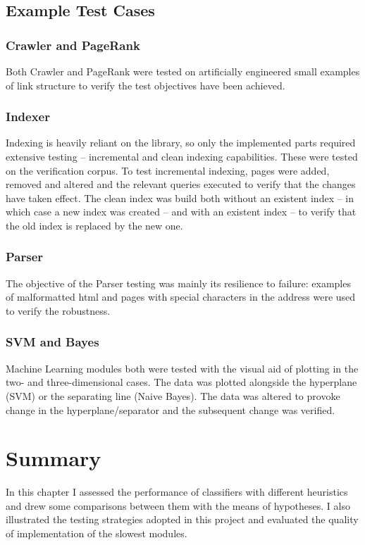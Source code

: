 \documentclass[12pt,notitlepage,twoside]{scrreprt}
\begin{document}
\subsection{Example Test Cases}
\subsubsection{Crawler and PageRank} Both Crawler and PageRank were tested on artificially
engineered small examples of link structure to verify the test objectives have been
achieved.  \subsubsection{Indexer} Indexing is heavily reliant on the library, so only the
implemented parts required extensive testing -- incremental and clean indexing
capabilities. These were tested on the verification corpus.  To test incremental indexing,
pages were added, removed and altered and the relevant queries executed to verify that the
changes have taken effect. The clean index was build both without an existent index -- in
which case a new index was created -- and with an existent index -- to verify that the old
index is replaced by the new one.  \subsubsection{Parser} The objective of the Parser
testing was mainly its resilience to failure: examples of malformatted html and pages with
special characters in the address were used to verify the robustness. \subsubsection{SVM
and Bayes} Machine Learning modules both were tested with the visual aid of plotting in
the two- and three-dimensional cases. The data was plotted alongside the hyperplane (SVM)
or the separating line (Naive Bayes). The data was altered to provoke change in the
hyperplane/separator and the subsequent change was verified.
\section{Summary}
In this chapter I assessed the performance of classifiers with different heuristics and
drew some comparisons between them with the means of hypotheses. I also illustrated the
testing strategies adopted in this project and evaluated the quality of implementation of
the slowest modules.
\cleardoublepage
\end{document}
